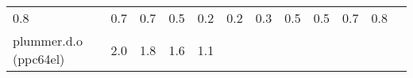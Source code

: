 \documentclass[parskip=half]{scrartcl}
\begin{document}
\begin{table}[h]
\begin{tabular}{@{}llllllllllll@{}}
\begin{minipage}[t]{0.05\columnwidth}
0.8\strut
\end{minipage} & \begin{minipage}[t]{0.05\columnwidth}\raggedright\strut
0.7\strut
\end{minipage} & \begin{minipage}[t]{0.05\columnwidth}\raggedright\strut
0.7\strut
\end{minipage} & \begin{minipage}[t]{0.05\columnwidth}\raggedright\strut
0.5\strut
\end{minipage} & \begin{minipage}[t]{0.05\columnwidth}\raggedright\strut
0.2\strut
\end{minipage} & \begin{minipage}[t]{0.05\columnwidth}\raggedright\strut
0.2\strut
\end{minipage} & \begin{minipage}[t]{0.05\columnwidth}\raggedright\strut
0.3\strut
\end{minipage} & \begin{minipage}[t]{0.05\columnwidth}\raggedright\strut
0.5\strut
\end{minipage} & \begin{minipage}[t]{0.05\columnwidth}\raggedright\strut
0.5\strut
\end{minipage} & \begin{minipage}[t]{0.05\columnwidth}\raggedright\strut
0.7\strut
\end{minipage} & \begin{minipage}[t]{0.05\columnwidth}\raggedright\strut
0.8\strut
\end{minipage}\tabularnewline
\begin{minipage}[t]{0.12\columnwidth}\raggedright\strut
plummer.d.o (ppc64el)\strut
\end{minipage} & \begin{minipage}[t]{0.05\columnwidth}\raggedright\strut
2.0\strut
\end{minipage} & \begin{minipage}[t]{0.05\columnwidth}\raggedright\strut
1.8\strut
\end{minipage} & \begin{minipage}[t]{0.05\columnwidth}\raggedright\strut
1.6\strut
\end{minipage} & \begin{minipage}[t]{0.05\columnwidth}\raggedright\strut
1.1\strut
\end{minipage} & \begin{minipage}[t]{0.05\columnwidth}\raggedright\strut

\end{minipage}
\end{tabular}
\end{table}
\end{document}
